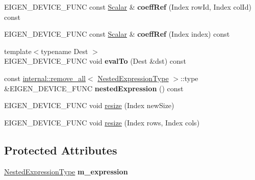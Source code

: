 \begin{DoxyCompactItemize}
\item 
\mbox{\label{class_eigen_1_1_array_wrapper_a83670116573156216d4bed85ebe37599}} 
E\+I\+G\+E\+N\+\_\+\+D\+E\+V\+I\+C\+E\+\_\+\+F\+U\+NC const \mbox{\hyperlink{class_eigen_1_1_dense_base_a5feed465b3a8e60c47e73ecce83e39a2}{Scalar}} \& {\bfseries coeff\+Ref} (Index row\+Id, Index col\+Id) const
\item 
\mbox{\label{class_eigen_1_1_array_wrapper_a1d4db31f7ca58d40330653452449f082}} 
E\+I\+G\+E\+N\+\_\+\+D\+E\+V\+I\+C\+E\+\_\+\+F\+U\+NC const \mbox{\hyperlink{class_eigen_1_1_dense_base_a5feed465b3a8e60c47e73ecce83e39a2}{Scalar}} \& {\bfseries coeff\+Ref} (Index index) const
\item 
\mbox{\label{class_eigen_1_1_array_wrapper_a6ba099249a5b810ca27c034992aea5f6}} 
{\footnotesize template$<$typename Dest $>$ }\\E\+I\+G\+E\+N\+\_\+\+D\+E\+V\+I\+C\+E\+\_\+\+F\+U\+NC void {\bfseries eval\+To} (Dest \&dst) const
\item 
\mbox{\label{class_eigen_1_1_array_wrapper_a6f6a207cbb33b777878e9a5860db4c14}} 
const \mbox{\hyperlink{struct_eigen_1_1internal_1_1remove__all}{internal\+::remove\+\_\+all}}$<$ \mbox{\hyperlink{struct_eigen_1_1internal_1_1true__type}{Nested\+Expression\+Type}} $>$\+::type \&E\+I\+G\+E\+N\+\_\+\+D\+E\+V\+I\+C\+E\+\_\+\+F\+U\+NC {\bfseries nested\+Expression} () const
\item 
E\+I\+G\+E\+N\+\_\+\+D\+E\+V\+I\+C\+E\+\_\+\+F\+U\+NC void \mbox{\hyperlink{class_eigen_1_1_array_wrapper_a04bcb4140d2b2f9bf571efddac135a21}{resize}} (Index new\+Size)
\item 
E\+I\+G\+E\+N\+\_\+\+D\+E\+V\+I\+C\+E\+\_\+\+F\+U\+NC void \mbox{\hyperlink{class_eigen_1_1_array_wrapper_aaead58c7011ff95bb588d9bb242aca8a}{resize}} (Index rows, Index cols)
\end{DoxyCompactItemize}
\subsection*{Protected Attributes}
\begin{DoxyCompactItemize}
\item 
\mbox{\label{class_eigen_1_1_array_wrapper_a0f3b6ee3358fdb5f4699d709254665f9}} 
\mbox{\hyperlink{struct_eigen_1_1internal_1_1true__type}{Nested\+Expression\+Type}} {\bfseries m\+\_\+expression}
\end{DoxyCompactItemize}
